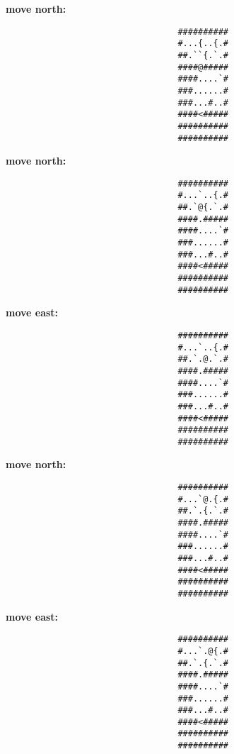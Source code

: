 \begin{MyGreenBox}
{	\textbf{move north:} \begin{verbatim}
                                  ##########
                                  #...{..{.#
                                  ##.``{.`.#
                                  ####@#####
                                  ####....`#
                                  ###......#
                                  ###...#..#
                                  ####<#####
                                  ##########
                                  ##########
\end{verbatim}

	\textbf{move north:} \begin{verbatim}
                                  ##########
                                  #...`..{.#
                                  ##.`@{.`.#
                                  ####.#####
                                  ####....`#
                                  ###......#
                                  ###...#..#
                                  ####<#####
                                  ##########
                                  ##########
\end{verbatim}

	\textbf{move east:} \begin{verbatim}
                                  ##########
                                  #...`..{.#
                                  ##.`.@.`.#
                                  ####.#####
                                  ####....`#
                                  ###......#
                                  ###...#..#
                                  ####<#####
                                  ##########
                                  ##########
\end{verbatim}

	\textbf{move north:} \begin{verbatim}
                                  ##########
                                  #...`@.{.#
                                  ##.`.{.`.#
                                  ####.#####
                                  ####....`#
                                  ###......#
                                  ###...#..#
                                  ####<#####
                                  ##########
                                  ##########
\end{verbatim}

	\textbf{move east:} \begin{verbatim}
                                  ##########
                                  #...`.@{.#
                                  ##.`.{.`.#
                                  ####.#####
                                  ####....`#
                                  ###......#
                                  ###...#..#
                                  ####<#####
                                  ##########
                                  ##########
\end{verbatim}

}
\end{MyGreenBox}
